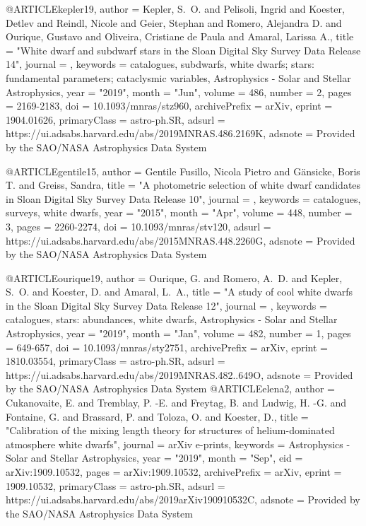 \documentclass[a4paper,fleqn,usenatbib]{mnras}
\begin{document}
@ARTICLE{kepler19,
       author = {{Kepler}, S.~O. and {Pelisoli}, Ingrid and {Koester}, Detlev and
         {Reindl}, Nicole and {Geier}, Stephan and {Romero}, Alejandra D. and
         {Ourique}, Gustavo and {Oliveira}, Cristiane de Paula and
         {Amaral}, Larissa A.},
        title = "{White dwarf and subdwarf stars in the Sloan Digital Sky Survey Data Release 14}",
      journal = {\mnras},
     keywords = {catalogues, subdwarfs, white dwarfs; stars: fundamental parameters; cataclysmic variables, Astrophysics - Solar and Stellar Astrophysics},
         year = "2019",
        month = "Jun",
       volume = {486},
       number = {2},
        pages = {2169-2183},
          doi = {10.1093/mnras/stz960},
archivePrefix = {arXiv},
       eprint = {1904.01626},
 primaryClass = {astro-ph.SR},
       adsurl = {https://ui.adsabs.harvard.edu/abs/2019MNRAS.486.2169K},
      adsnote = {Provided by the SAO/NASA Astrophysics Data System}
}


@ARTICLE{gentile15,
       author = {{Gentile Fusillo}, Nicola Pietro and {G{\"a}nsicke}, Boris T. and
         {Greiss}, Sandra},
        title = "{A photometric selection of white dwarf candidates in Sloan Digital Sky Survey Data Release 10}",
      journal = {\mnras},
     keywords = {catalogues, surveys, white dwarfs},
         year = "2015",
        month = "Apr",
       volume = {448},
       number = {3},
        pages = {2260-2274},
          doi = {10.1093/mnras/stv120},
       adsurl = {https://ui.adsabs.harvard.edu/abs/2015MNRAS.448.2260G},
      adsnote = {Provided by the SAO/NASA Astrophysics Data System}
}



@ARTICLE{ourique19,
       author = {{Ourique}, G. and {Romero}, A.~D. and {Kepler}, S.~O. and {Koester}, D. and
         {Amaral}, L.~A.},
        title = "{A study of cool white dwarfs in the Sloan Digital Sky Survey Data Release 12}",
      journal = {\mnras},
     keywords = {catalogues, stars: abundances, white dwarfs, Astrophysics - Solar and Stellar Astrophysics},
         year = "2019",
        month = "Jan",
       volume = {482},
       number = {1},
        pages = {649-657},
          doi = {10.1093/mnras/sty2751},
archivePrefix = {arXiv},
       eprint = {1810.03554},
 primaryClass = {astro-ph.SR},
       adsurl = {https://ui.adsabs.harvard.edu/abs/2019MNRAS.482..649O},
      adsnote = {Provided by the SAO/NASA Astrophysics Data System}
}
@ARTICLE{elena2,
       author = {{Cukanovaite}, E. and {Tremblay}, P. -E. and {Freytag}, B. and
         {Ludwig}, H. -G. and {Fontaine}, G. and {Brassard}, P. and
         {Toloza}, O. and {Koester}, D.},
        title = "{Calibration of the mixing length theory for structures of helium-dominated atmosphere white dwarfs}",
      journal = {arXiv e-prints},
     keywords = {Astrophysics - Solar and Stellar Astrophysics},
         year = "2019",
        month = "Sep",
          eid = {arXiv:1909.10532},
        pages = {arXiv:1909.10532},
archivePrefix = {arXiv},
       eprint = {1909.10532},
 primaryClass = {astro-ph.SR},
       adsurl = {https://ui.adsabs.harvard.edu/abs/2019arXiv190910532C},
      adsnote = {Provided by the SAO/NASA Astrophysics Data System}
}
\end{document}
